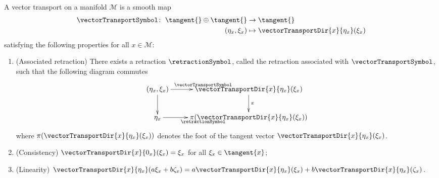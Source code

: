 \begin{definition}\label{VectorTransport}
    A vector transport on a manifold $\mathcal{M}$ is a smooth map 
    \begin{align*}
        \vectorTransportSymbol \colon \; \tangent{} \oplus \tangent{} & \to \tangent{} \\
        (\eta_x, \xi_x) & \mapsto \vectorTransportDir{x}{\eta_x}(\xi_x)
    \end{align*}    
    satisfying the following properties for all $x \in \mathcal{M}$:
    \begin{enumerate}
        \item (Associated retraction) There exists a retraction $\retractionSymbol$, called the retraction associated with $\vectorTransportSymbol$, such that the following diagram commutes \begin{equation*}
        \begin{xy} \xymatrix{(\eta_x, \xi_x) \ar[r]^{\vectorTransportSymbol} \ar[d] & \vectorTransportDir{x}{\eta_x}(\xi_x) \ar[d]^\pi \\ \eta_x \ar[r]_{\retractionSymbol} & \pi (\vectorTransportDir{x}{\eta_x}(\xi_x)) } \end{xy} \end{equation*} where $\pi (\vectorTransportDir{x}{\eta_x}(\xi_x))$ denotes the foot of the tangent vector $\vectorTransportDir{x}{\eta_x}(\xi_x)$. \label{VectorTransport1}
        \item (Consistency) $\vectorTransportDir{x}{0_x}(\xi_x) = \xi_x$ for all $\xi_x \in \tangent{x}$; 
        \item (Linearity) $\vectorTransportDir{x}{\eta_x}(a \xi_x + b \zeta_x) = a \vectorTransportDir{x}{\eta_x}(\xi_x) + b \vectorTransportDir{x}{\eta_x}(\zeta_x)$.
    \end{enumerate}
\end{definition}

